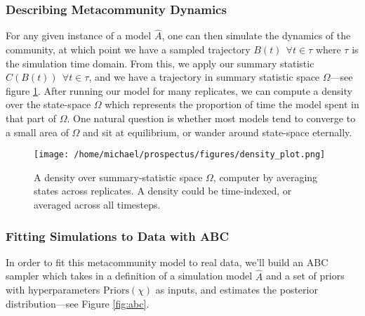 \documentclass[]{article}
\begin{document}
\hypertarget{finding-the-pseudoequilibria-of-our-metacommunity-model}{%
\subsubsection{Describing Metacommunity Dynamics}
\label{finding-the-pseudoequilibria-of-our-metacommunity-model}}

For any given instance of a model $\hat{A}$, one can then simulate the dynamics of the community, at which point we have a sampled trajectory $B(t) \ \ \forall t \in \tau$ where $\tau$ is the simulation time domain. From this, we apply our summary statistic $C(B(t)) \ \ \forall t \in \tau$, and we have a trajectory in summary statistic space $\Omega$---see figure \ref{fig:density}. After running our model for many replicates, we can compute a density over the state-space $\Omega$ which represents the proportion of time the model spent in that part of $\Omega$.
One natural question is whether most models tend to converge to a small area of $\Omega$ and sit at equilibrium, or wander around state-space eternally.



\begin{figure}[H]
\centering
\texttt{[image: /home/michael/prospectus/figures/density\_plot.png]}
\caption{A density over summary-statistic space $\Omega$, computer by averaging states across replicates. A density could be time-indexed, or averaged across all timesteps.} \label{fig:density}
\end{figure}

\hypertarget{fitting-to-data-with-abc}{%
\subsubsection{Fitting Simulations to Data with
ABC}\label{fitting-to-data-with-abc}}

In order to fit this metacommunity model to real data, we'll build an ABC sampler which takes in a definition of a simulation model $\hat{A}$
and a set of priors with hyperparameters
$\text{Priors}(\chi)$ as inputs, and estimates the posterior distribution---see Figure \ref{fig:abc}.
\end{document}

